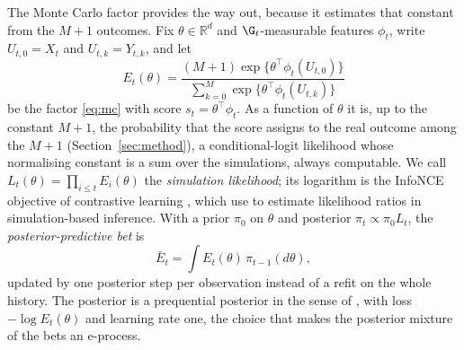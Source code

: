 The Monte Carlo factor provides the way out, because it estimates that
constant from the $M+1$ outcomes. Fix $\theta \in \mathbb{R}^d$ and
$\G_t$-measurable features $\phi_t$, write $U_{t,0} = X_t$ and
$U_{t,k} = Y_{t,k}$, and let
\[
E_t(\theta) = \frac{(M+1)\exp\{\theta^\top\phi_t(U_{t,0})\}}
{\sum_{k=0}^{M}\exp\{\theta^\top\phi_t(U_{t,k})\}}
\]
be the factor \eqref{eq:mc} with score $s_t = \theta^\top\phi_t$. As a
function of $\theta$ it is, up to the constant $M+1$, the probability that the
score assigns to the real outcome among the $M+1$
(Section~\ref{sec:method}), a conditional-logit likelihood whose normalising
constant is a sum over the simulations, always computable. We call
$L_t(\theta) = \prod_{i \le t} E_i(\theta)$ the \emph{simulation likelihood};
its logarithm is the InfoNCE objective of contrastive learning
\citep{oord2018representation,ma2018noise}, which \citet{durkan2020contrastive}
use to estimate likelihood ratios in simulation-based inference. With a prior $\pi_0$ on $\theta$
and posterior $\pi_t \propto \pi_0 L_t$, the \emph{posterior-predictive bet}
is
\[
\bar E_t = \int E_t(\theta)\, \pi_{t-1}(d\theta),
\]
updated by one posterior step per observation instead of a refit on the whole
history. The posterior is a prequential posterior in the sense of
\citet{sinharoy2026prequential}, with loss $-\log E_t(\theta)$ and learning
rate one, the choice that makes the posterior mixture of the bets an
e-process.

